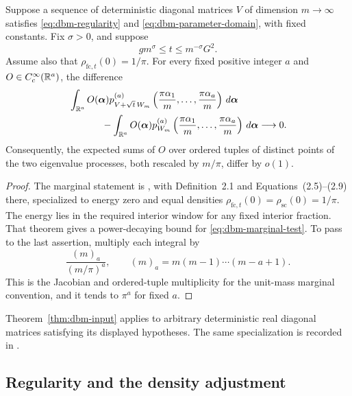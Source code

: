 \begin{theorem}
\label{thm:dbm-input}
Suppose a sequence of deterministic diagonal matrices \(V\) of dimension
\(m\to\infty\) satisfies \eqref{eq:dbm-regularity} and
\eqref{eq:dbm-parameter-domain}, with fixed constants. Fix \(\sigma>0\),
and suppose
\begin{equation}
 \label{eq:dbm-time-window}
 g m^\sigma\le t\le m^{-\sigma}G^2.
\end{equation}
Assume also that \(\rho_{\mathrm{fc},t}(0)=1/\pi\).
For every fixed positive integer \(a\) and
\(O\in C_c^\infty(\mathbb R^a)\), the difference
\begin{align}
 \label{eq:dbm-marginal-test}
 &\int_{\RR^a}O(\boldsymbol\alpha)
   p_{V+\sqrt t\,W_m}^{(a)}
      \left(\frac{\pi\alpha_1}{m},\ldots,
            \frac{\pi\alpha_a}{m}\right)
       \,d\boldsymbol\alpha \notag\\
 &\hspace{12mm}-
 \int_{\RR^a}O(\boldsymbol\alpha)
   p_{W_m}^{(a)}
      \left(\frac{\pi\alpha_1}{m},\ldots,
            \frac{\pi\alpha_a}{m}\right)
       \,d\boldsymbol\alpha
 \longrightarrow0.
\end{align}
Consequently, the expected sums of \(O\) over ordered tuples of
distinct points of the two eigenvalue processes, both rescaled by
\(m/\pi\), differ by \(o(1)\).
\end{theorem}

\begin{proof}
The marginal statement is \cite[Theorem~2.2]{LSY2019}, with
Definition~2.1 and Equations~(2.5)--(2.9) there, specialized to energy zero and equal densities
\(\rho_{\mathrm{fc},t}(0)=\rho_{\mathrm{sc}}(0)=1/\pi\).
The energy lies in the required interior window for any fixed interior
fraction. That theorem gives a power-decaying bound for
\eqref{eq:dbm-marginal-test}. To pass to the last assertion, multiply
each integral by
\[
 \frac{(m)_a}{(m/\pi)^a},
 \qquad
 (m)_a=m(m-1)\cdots(m-a+1).
\]
This is the Jacobian and ordered-tuple multiplicity for the unit-mass
marginal convention, and it tends to \(\pi^a\) for fixed \(a\).
\end{proof}

Theorem~\ref{thm:dbm-input} applies to arbitrary deterministic
real diagonal matrices satisfying its displayed hypotheses.
The same specialization is recorded in \cite[Theorem~6.1]{bu}.

\subsection{Regularity and the density adjustment}

